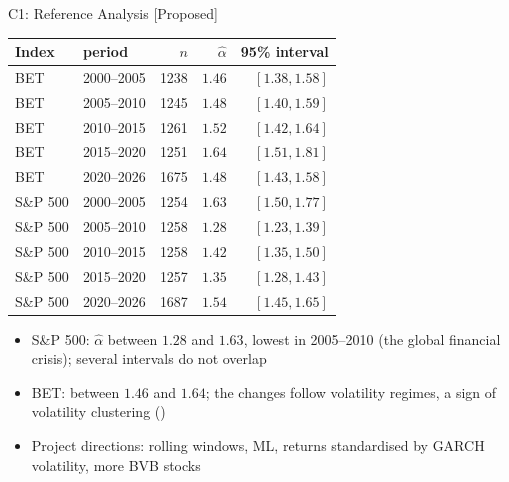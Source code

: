 \ifsolutions
\begin{frame}{C1: Reference Analysis [Proposed]}
\itemsize{\scriptsize}
\begin{center}
\scriptsize
\begin{tabular}{llrrr}
\toprule
Index & period & $n$ & $\hat\alpha$ & 95\% interval \\
\midrule
BET & 2000--2005 & 1238 & $1.46$ & $[1.38, 1.58]$ \\
BET & 2005--2010 & 1245 & $1.48$ & $[1.40, 1.59]$ \\
BET & 2010--2015 & 1261 & $1.52$ & $[1.42, 1.64]$ \\
BET & 2015--2020 & 1251 & $1.64$ & $[1.51, 1.81]$ \\
BET & 2020--2026 & 1675 & $1.48$ & $[1.43, 1.58]$ \\
S\&P 500 & 2000--2005 & 1254 & $1.63$ & $[1.50, 1.77]$ \\
S\&P 500 & 2005--2010 & 1258 & $1.28$ & $[1.23, 1.39]$ \\
S\&P 500 & 2010--2015 & 1258 & $1.42$ & $[1.35, 1.50]$ \\
S\&P 500 & 2015--2020 & 1257 & $1.35$ & $[1.28, 1.43]$ \\
S\&P 500 & 2020--2026 & 1687 & $1.54$ & $[1.45, 1.65]$ \\
\bottomrule
\end{tabular}
\end{center}
\begin{itemize}
    \item S\&P 500: $\hat\alpha$ between $1.28$ and $1.63$, lowest in 2005--2010 (the global financial crisis); several intervals do not overlap
    \item BET: between $1.46$ and $1.64$; the changes follow volatility regimes, a sign of volatility clustering ()
    \item Project directions: rolling windows, ML, returns standardised by GARCH volatility, more BVB stocks
\end{itemize}
\end{frame}
\fi

